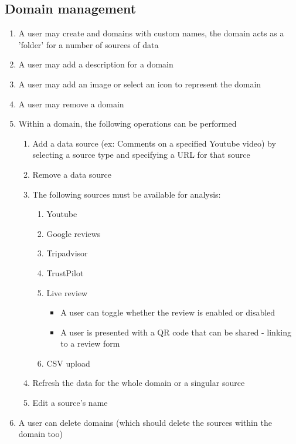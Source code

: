 \documentclass[12pt]{article}
\begin{document}
\subsection{Domain management}
\begin{enumerate}
  \item A user may create and domains with custom names, the domain acts as a 'folder' for a number of sources of data
  \item A user may add a description for a domain
  \item A user may add an image or select an icon to represent the domain
  \item A user may remove a domain
  \item Within a domain, the following operations can be performed
        \begin{enumerate}
          \item Add a data source (ex: Comments on a specified Youtube video) by selecting a source type and specifying a URL for that source
          \item Remove a data source
          \item The following sources must be available for analysis:
                \begin{enumerate}
                  \item Youtube
                  \item Google reviews
                  \item Tripadvisor
                  \item TrustPilot
                  \item Live review \begin{itemize}
                    \item A user can toggle whether the review is enabled or disabled 
                    \item A user is presented with a QR code that can be shared - linking to a review form
                  \end{itemize}
                  \item CSV upload
                \end{enumerate}
          \item Refresh the data for the whole domain or a singular source
          \item Edit a source's name
        \end{enumerate}
  \item A user can delete domains (which should delete the sources within the domain too)
\end{enumerate}
\end{document}
